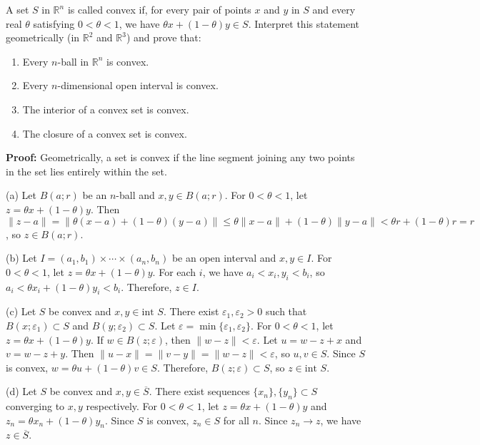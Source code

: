 \begin{problembox}
A set \( S \) in \( \mathbb{R}^n \) is called convex if, for every pair of points \( x \) and \( y \) in \( S \) and every real \( \theta \) satisfying \( 0 < \theta < 1 \), we have \( \theta x + (1 - \theta)y \in S \). Interpret this statement geometrically (in \( \mathbb{R}^2 \) and \( \mathbb{R}^3 \)) and prove that:
\begin{enumerate}[label=\alph*)]
\item Every \( n \)-ball in \( \mathbb{R}^n \) is convex.
\item Every \( n \)-dimensional open interval is convex.
\item The interior of a convex set is convex.
\item The closure of a convex set is convex.
\end{enumerate}
\end{problembox}

\textbf{Proof:} Geometrically, a set is convex if the line segment joining any two points in the set lies entirely within the set.

(a) Let $B(a;r)$ be an $n$-ball and $x, y \in B(a;r)$. For $0 < \theta < 1$, let $z = \theta x + (1-\theta)y$. Then $\|z-a\| = \|\theta(x-a) + (1-\theta)(y-a)\| \leq \theta\|x-a\| + (1-\theta)\|y-a\| < \theta r + (1-\theta)r = r$, so $z \in B(a;r)$.

(b) Let $I = (a_1,b_1) \times \cdots \times (a_n,b_n)$ be an open interval and $x, y \in I$. For $0 < \theta < 1$, let $z = \theta x + (1-\theta)y$. For each $i$, we have $a_i < x_i, y_i < b_i$, so $a_i < \theta x_i + (1-\theta)y_i < b_i$. Therefore, $z \in I$.

(c) Let $S$ be convex and $x, y \in \text{int } S$. There exist $\varepsilon_1, \varepsilon_2 > 0$ such that $B(x;\varepsilon_1) \subset S$ and $B(y;\varepsilon_2) \subset S$. Let $\varepsilon = \min\{\varepsilon_1, \varepsilon_2\}$. For $0 < \theta < 1$, let $z = \theta x + (1-\theta)y$. If $w \in B(z;\varepsilon)$, then $\|w-z\| < \varepsilon$. Let $u = w - z + x$ and $v = w - z + y$. Then $\|u-x\| = \|v-y\| = \|w-z\| < \varepsilon$, so $u, v \in S$. Since $S$ is convex, $w = \theta u + (1-\theta)v \in S$. Therefore, $B(z;\varepsilon) \subset S$, so $z \in \text{int } S$.

(d) Let $S$ be convex and $x, y \in \overline{S}$. There exist sequences $\{x_n\}, \{y_n\} \subset S$ converging to $x, y$ respectively. For $0 < \theta < 1$, let $z = \theta x + (1-\theta)y$ and $z_n = \theta x_n + (1-\theta)y_n$. Since $S$ is convex, $z_n \in S$ for all $n$. Since $z_n \to z$, we have $z \in \overline{S}$.

